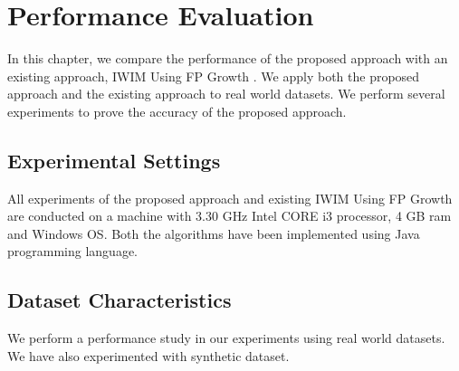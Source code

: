 


\chapter{Performance Evaluation}
\label{Chapter 4}
%
In this chapter, we compare the performance of the proposed approach with an existing approach, IWIM Using FP Growth \cite{dnd}. We apply both the proposed approach and the existing approach to real world datasets. We perform several experiments to prove the accuracy of the proposed approach. 
\section{Experimental Settings}
%
All experiments of the proposed approach and existing IWIM Using FP Growth are conducted on a machine with 3.30 GHz Intel CORE i3 processor, 4 GB ram and Windows OS. Both the algorithms have been implemented using Java programming language. 
\section{Dataset Characteristics}
%
We perform a performance study in our experiments using real world datasets. We have also experimented with synthetic dataset.
%


